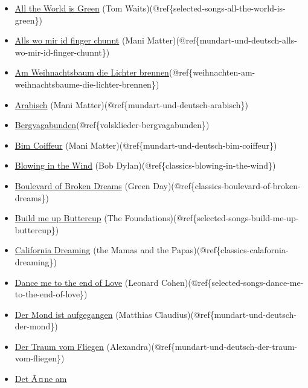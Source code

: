 \documentclass[
]{article}
\providecommand{\tightlist}{%
  \setlength{\itemsep}{0pt}\setlength{\parskip}{0pt}}
\begin{document}
\begin{itemize}
\tightlist
\item
  \protect\hyperlink{selected-songs-all-the-world-is-green}{All the
  World is Green} (Tom
  Waits)(@ref\{selected-songs-all-the-world-is-green\})
\item
  \protect\hyperlink{mundart-und-deutsch-alls-wo-mir-id-finger-chunnt}{Alls
  wo mir id finger chunnt} (Mani
  Matter)(@ref\{mundart-und-deutsch-alls-wo-mir-id-finger-chunnt\})
\item
  \protect\hyperlink{weihnachten-am-weihnachtsbaume-die-lichter-brennen}{Am
  Weihnachtsbaum die Lichter
  brennen}(@ref\{weihnachten-am-weihnachtsbaume-die-lichter-brennen\})
\item
  \protect\hyperlink{mundart-und-deutsch-arabisch}{Arabisch} (Mani
  Matter)(@ref\{mundart-und-deutsch-arabisch\})
\item
  \protect\hyperlink{volsklieder-bergvagabunden}{Bergvagabunden}(@ref\{volsklieder-bergvagabunden\})
\item
  \protect\hyperlink{mundart-und-deutsch-bim-coiffeur}{Bim Coiffeur}
  (Mani Matter)(@ref\{mundart-und-deutsch-bim-coiffeur\})
\item
  \protect\hyperlink{classics-blowing-in-the-wind}{Blowing in the Wind}
  (Bob Dylan)(@ref\{classics-blowing-in-the-wind\})
\item
  \protect\hyperlink{classics-boulevard-of-broken-dreams}{Boulevard of
  Broken Dreams} (Green
  Day)(@ref\{classics-boulevard-of-broken-dreams\})
\item
  \protect\hyperlink{selected-songs-build-me-up-buttercup}{Build me up
  Buttercup} (The
  Foundations)(@ref\{selected-songs-build-me-up-buttercup\})
\item
  \protect\hyperlink{classics-calafornia-dreaming}{California Dreaming}
  (the Mamas and the Papas)(@ref\{classics-calafornia-dreaming\})
\item
  \protect\hyperlink{selected-songs-dance-me-to-the-end-of-love}{Dance
  me to the end of Love} (Leonard
  Cohen)(@ref\{selected-songs-dance-me-to-the-end-of-love\})
\item
  \protect\hyperlink{mundart-und-deutsch-der-mond}{Der Mond ist
  aufgegangen} (Matthias Claudius)(@ref\{mundart-und-deutsch-der-mond\})
\item
  \protect\hyperlink{mundart-und-deutsch-der-traum-vom-fliegen}{Der
  Traum vom Fliegen}
  (Alexandra)(@ref\{mundart-und-deutsch-der-traum-vom-fliegen\})
\item
  \protect\hyperlink{mundart-und-deutsch-det-ane-am-bergli}{Det Ã¤ne am
}
\end{itemize}
\end{document}
